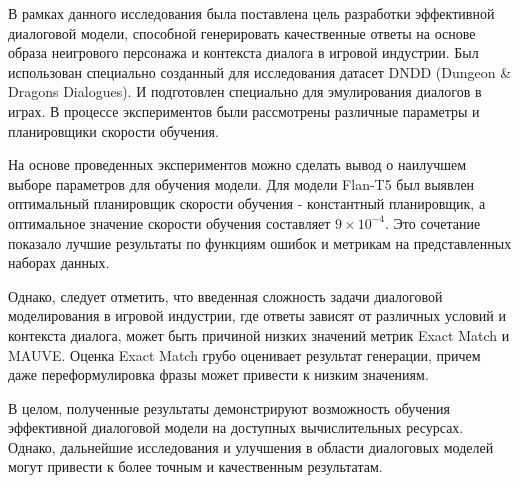 
В рамках данного исследования была поставлена цель разработки эффективной диалоговой модели, способной генерировать качественные ответы на основе образа неигрового персонажа и контекста диалога в игровой индустрии. Был использован специально созданный для исследования датасет DNDD (Dungeon \& Dragons Dialogues). И подготовлен специально для эмулирования диалогов в играх. В процессе экспериментов были рассмотрены различные параметры и планировщики скорости обучения.

На основе проведенных экспериментов можно сделать вывод о наилучшем выборе параметров для обучения модели. Для модели Flan-T5 был выявлен оптимальный планировщик скорости обучения - константный планировщик, а оптимальное значение скорости обучения составляет $9 \times 10^{-4}$. Это сочетание показало лучшие результаты по функциям ошибок и метрикам на представленных наборах данных.

Однако, следует отметить, что введенная сложность задачи диалоговой моделирования в игровой индустрии, где ответы зависят от различных условий и контекста диалога, может быть причиной низких значений метрик Exact Match и MAUVE. Оценка Exact Match грубо оценивает результат генерации, причем даже переформулировка фразы может привести к низким значениям.

В целом, полученные результаты демонстрируют возможность обучения эффективной диалоговой модели на доступных вычислительных ресурсах. Однако, дальнейшие исследования и улучшения в области диалоговых моделей могут привести к более точным и качественным результатам.